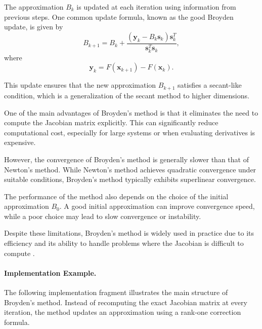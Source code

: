 The approximation \( B_k \) is updated at each iteration using information from previous steps. One common update formula, known as the good Broyden update, is given by
\begin{equation}
B_{k+1} = B_k + \frac{(\mathbf{y}_k - B_k \mathbf{s}_k)\mathbf{s}_k^T}{\mathbf{s}_k^T \mathbf{s}_k},
\end{equation}
where
\begin{equation}
\mathbf{y}_k = F(\mathbf{x}_{k+1}) - F(\mathbf{x}_k).
\end{equation}

This update ensures that the new approximation \( B_{k+1} \) satisfies a secant-like condition, which is a generalization of the secant method to higher dimensions.

One of the main advantages of Broyden's method is that it eliminates the need to compute the Jacobian matrix explicitly. This can significantly reduce computational cost, especially for large systems or when evaluating derivatives is expensive.

However, the convergence of Broyden's method is generally slower than that of Newton's method. While Newton's method achieves quadratic convergence under suitable conditions, Broyden's method typically exhibits superlinear convergence.

The performance of the method also depends on the choice of the initial approximation \( B_0 \). A good initial approximation can improve convergence speed, while a poor choice may lead to slow convergence or instability.

Despite these limitations, Broyden's method is widely used in practice due to its efficiency and its ability to handle problems where the Jacobian is difficult to compute \cite{kelley}.

\paragraph{Implementation Example.}

The following implementation fragment illustrates the main structure of Broyden's method. Instead of recomputing the exact Jacobian matrix at every iteration, the method updates an approximation using a rank-one correction formula.

